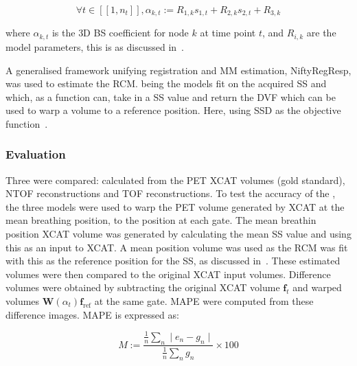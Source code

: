                 \begin{equation}  \label{eq:b_spline_coefficients}
                    \forall t \in [[1,n_t]], \alpha_{k,t} := R_{1,k} s_{1,t} + R_{2,k} s_{2,t} + R_{3,k}
                \end{equation}
                
                \noindent where $\alpha_{k,t}$ is the \gls{3D} \gls{BS} coefficient for node $k$ at time point $t$, and $R_{i,k}$ are the model parameters, this is as discussed in~.
            
                A generalised framework unifying registration and \gls{MM} estimation, NiftyRegResp, was used to estimate the \gls{RCM}.  being the models fit on the acquired \gls{SS} and  which, as a function can, take in a \gls{SS} value and return the \gls{DVF} which can be used to warp a volume to a reference position. Here, using \gls{SSD} as the objective function~.
                
            \subsubsection{Evaluation} \label{sec:impact_of_tof_on_respiratory_motion_model_estimation_using_pre_gated_no_intra_cycle_motion_nac_pet_methods_evaluation}
                Three  were compared: calculated from the \gls{PET} \gls{XCAT} volumes (gold standard), \gls{NTOF}  reconstructions and \gls{TOF}  reconstructions. To test the accuracy of the , the three models were used to warp the \gls{PET} volume generated by \gls{XCAT} at the mean breathing position, to the position at each gate. The mean breathin position \gls{XCAT} volume was generated by calculating the mean \gls{SS} value and using this as an input to \gls{XCAT}. A mean position volume was used as the \gls{RCM} was fit with this as the reference position for the \gls{SS}, as discussed in~. These estimated volumes were then compared to the original \gls{XCAT} input volumes. Difference volumes were obtained by subtracting the original \gls{XCAT} volume $\mathbf{f}_t$ and warped volumes $\mathbf{W}(\alpha_t) \mathbf{f}_\mathrm{ref}$ at the same gate. \gls{MAPE} were computed from these difference images. \gls{MAPE} is expressed as:
                
                \begin{equation}  \label{eq:mape}
                   M := \frac{\frac{1}{n}\sum_{n}\mid e_n - g_n \mid}{\frac{1}{n}\sum_{n}g_n} \times 100
                \end{equation}
                
